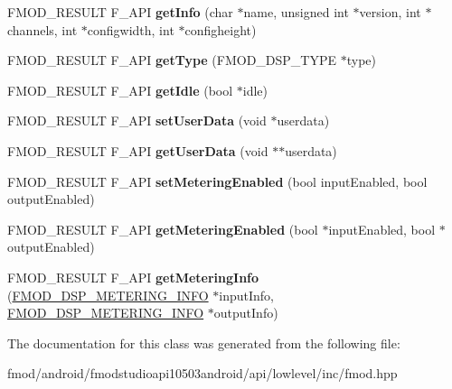 \begin{DoxyCompactItemize}
\item 
\hypertarget{class_f_m_o_d_1_1_d_s_p_a5bb61015d7b0e835437e46ea4eaf6442}{F\+M\+O\+D\+\_\+\+R\+E\+S\+U\+L\+T F\+\_\+\+A\+P\+I {\bfseries get\+Info} (char $\ast$name, unsigned int $\ast$version, int $\ast$channels, int $\ast$configwidth, int $\ast$configheight)}\label{class_f_m_o_d_1_1_d_s_p_a5bb61015d7b0e835437e46ea4eaf6442}

\item 
\hypertarget{class_f_m_o_d_1_1_d_s_p_a7241c2669554667f90d4f2a576f64c4a}{F\+M\+O\+D\+\_\+\+R\+E\+S\+U\+L\+T F\+\_\+\+A\+P\+I {\bfseries get\+Type} (F\+M\+O\+D\+\_\+\+D\+S\+P\+\_\+\+T\+Y\+P\+E $\ast$type)}\label{class_f_m_o_d_1_1_d_s_p_a7241c2669554667f90d4f2a576f64c4a}

\item 
\hypertarget{class_f_m_o_d_1_1_d_s_p_aaada6f5f69622219628cefce0185dec2}{F\+M\+O\+D\+\_\+\+R\+E\+S\+U\+L\+T F\+\_\+\+A\+P\+I {\bfseries get\+Idle} (bool $\ast$idle)}\label{class_f_m_o_d_1_1_d_s_p_aaada6f5f69622219628cefce0185dec2}

\item 
\hypertarget{class_f_m_o_d_1_1_d_s_p_a5aacd4725dbe50b725146bd6c412b0f4}{F\+M\+O\+D\+\_\+\+R\+E\+S\+U\+L\+T F\+\_\+\+A\+P\+I {\bfseries set\+User\+Data} (void $\ast$userdata)}\label{class_f_m_o_d_1_1_d_s_p_a5aacd4725dbe50b725146bd6c412b0f4}

\item 
\hypertarget{class_f_m_o_d_1_1_d_s_p_a1b9014166d1ad45923da3227d8db3439}{F\+M\+O\+D\+\_\+\+R\+E\+S\+U\+L\+T F\+\_\+\+A\+P\+I {\bfseries get\+User\+Data} (void $\ast$$\ast$userdata)}\label{class_f_m_o_d_1_1_d_s_p_a1b9014166d1ad45923da3227d8db3439}

\item 
\hypertarget{class_f_m_o_d_1_1_d_s_p_a6632c3020c1a14c13786bab1a3d42688}{F\+M\+O\+D\+\_\+\+R\+E\+S\+U\+L\+T F\+\_\+\+A\+P\+I {\bfseries set\+Metering\+Enabled} (bool input\+Enabled, bool output\+Enabled)}\label{class_f_m_o_d_1_1_d_s_p_a6632c3020c1a14c13786bab1a3d42688}

\item 
\hypertarget{class_f_m_o_d_1_1_d_s_p_af5817c9b777dd6b55f8f5bc53cd3fe17}{F\+M\+O\+D\+\_\+\+R\+E\+S\+U\+L\+T F\+\_\+\+A\+P\+I {\bfseries get\+Metering\+Enabled} (bool $\ast$input\+Enabled, bool $\ast$output\+Enabled)}\label{class_f_m_o_d_1_1_d_s_p_af5817c9b777dd6b55f8f5bc53cd3fe17}

\item 
\hypertarget{class_f_m_o_d_1_1_d_s_p_ad3089cd60092068633a1be0d1771e366}{F\+M\+O\+D\+\_\+\+R\+E\+S\+U\+L\+T F\+\_\+\+A\+P\+I {\bfseries get\+Metering\+Info} (\hyperlink{struct_f_m_o_d___d_s_p___m_e_t_e_r_i_n_g___i_n_f_o}{F\+M\+O\+D\+\_\+\+D\+S\+P\+\_\+\+M\+E\+T\+E\+R\+I\+N\+G\+\_\+\+I\+N\+F\+O} $\ast$input\+Info, \hyperlink{struct_f_m_o_d___d_s_p___m_e_t_e_r_i_n_g___i_n_f_o}{F\+M\+O\+D\+\_\+\+D\+S\+P\+\_\+\+M\+E\+T\+E\+R\+I\+N\+G\+\_\+\+I\+N\+F\+O} $\ast$output\+Info)}\label{class_f_m_o_d_1_1_d_s_p_ad3089cd60092068633a1be0d1771e366}

\end{DoxyCompactItemize}


The documentation for this class was generated from the following file\+:\begin{DoxyCompactItemize}
\item 
fmod/android/fmodstudioapi10503android/api/lowlevel/inc/fmod.\+hpp\end{DoxyCompactItemize}
